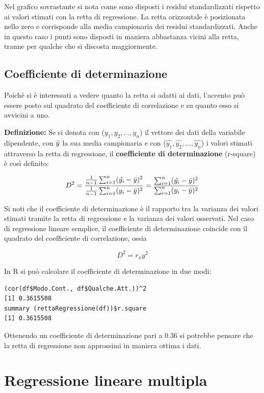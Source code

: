Nel grafico sovrastante si nota come sono disposti i residui standardizzati rispetto ai valori stimati con la retta di regressione. La retta orizzontale è posizionata nello zero e corrisponde alla media campionaria dei residui standardizzati. Anche in questo caso i punti sono disposti in maniera abbastanza vicini alla retta, tranne per qualche che si discosta maggiormente.

\subsection{Coefficiente di determinazione}\label{cap4.2.2}

Poichè si è interessati a vedere quanto la retta si adatti ai dati, l'accento può essere posto sul quadrato del coefficiente di correlazione e su quanto esso si avvicini a uno.

\noindent \textbf{Definizione:} Se si denota con ($y_1, y_2, ..., y_n$) il vettore dei dati della variabile dipendente, con $\Bar{y}$ la sua media campionaria e con ($\hat{y_1}, \hat{y_2}, ..., \hat{y_n}$) i valori stimati attraverso la retta di regressione, il \textbf{coefficiente di determinazione} (r-square) è così definito:

\[D^2 = \frac{\frac{1}{n-1} \sum_{i=1}^n (\hat{y_i} - \Bar{y})^2}{\frac{1}{n-1} \sum_{i=1}^n (y_i - \Bar{y})^2} = \frac{\sum_{i=1}^n (\hat{y_i} - \Bar{y})^2}{\sum_{i=1}^n (y_i - \Bar{y})^2}\] 

Si noti che il coefficiente di determinazione è il rapporto tra la varianza dei valori stimati tramite la retta di regressione e la varianza dei valori osservati. Nel caso di regressione lineare semplice, il coefficiente di determinazione coincide con il quadrato del coefficiente di correlazione, ossia

\[D^2 = r_xy^2\]

In R si può calcolare il coefficiente di determinazione in due modi:

\vspace{5mm}
\begin{lstlisting}
(cor(df$Modo.Cont., df$Qualche.Att.))^2
[1] 0.3615508
summary (rettaRegressione(df))$r.square
[1] 0.3615508
\end{lstlisting}
\vspace{5mm}

Ottenendo un coefficiente di determinazione pari a 0.36 si potrebbe pensare che la retta di regressione non approssimi in maniera ottima i dati.

\section{Regressione lineare multipla}\label{cap4.3}

